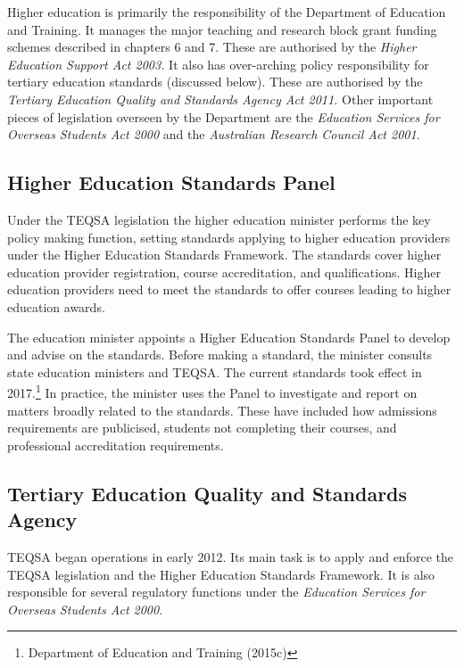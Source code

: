 \documentclass[]{book}
\begin{document}
Higher education is primarily the responsibility of the Department of Education and Training. It manages the major teaching and research block grant funding schemes described in chapters 6 and 7. These are authorised by the \emph{Higher Education Support Act 2003.} It also has over-arching policy responsibility for tertiary education standards (discussed below). These are authorised by the \emph{Tertiary Education Quality and Standards Agency Act 2011.} Other important pieces of legislation overseen by the Department are the \emph{Education Services for Overseas Students Act 2000} and the \emph{Australian Research Council Act 2001}.

\hypertarget{higher-education-standards-panel}{%
\subsection{Higher Education Standards Panel}\label{higher-education-standards-panel}}

Under the TEQSA legislation the higher education minister performs the key policy making function, setting standards applying to higher education providers under the Higher Education Standards Framework. The standards cover higher education provider registration, course accreditation, and qualifications. Higher education providers need to meet the standards to offer courses leading to higher education awards.

The education minister appoints a Higher Education Standards Panel to develop and advise on the standards. Before making a standard, the minister consults state education ministers and TEQSA. The current standards took effect in 2017.\footnote{Department of Education and Training (2015c)} In practice, the minister uses the Panel to investigate and report on matters broadly related to the standards. These have included how admissions requirements are publicised, students not completing their courses, and professional accreditation requirements.

\hypertarget{tertiary-education-quality-and-standards-agency}{%
\subsection{Tertiary Education Quality and Standards Agency}\label{tertiary-education-quality-and-standards-agency}}

TEQSA began operations in early 2012. Its main task is to apply and enforce the TEQSA legislation and the Higher Education Standards Framework. It is also responsible for several regulatory functions under the \emph{Education Services for Overseas Students Act 2000}.
\end{document}
